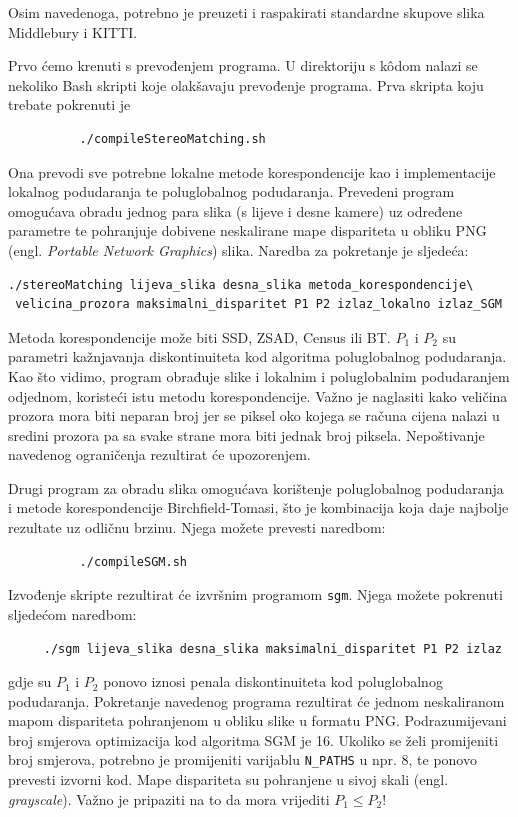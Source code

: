 \documentclass[utf8, zavrsni, numeric]{fer}
\begin{document}
Osim navedenoga, potrebno je preuzeti i raspakirati standardne skupove slika Middlebury i
KITTI.

Prvo ćemo krenuti s prevođenjem programa. U direktoriju s k\^odom nalazi se nekoliko Bash skripti koje olakšavaju prevođenje programa. Prva skripta koju trebate pokrenuti je
\begin{verbatim}
          ./compileStereoMatching.sh
\end{verbatim}
Ona prevodi sve potrebne lokalne metode korespondencije kao i implementacije lokalnog podudaranja te poluglobalnog podudaranja. Prevedeni program omogućava obradu jednog para slika (s lijeve i desne kamere) uz određene parametre te pohranjuje dobivene neskalirane mape dispariteta
u obliku PNG (engl. {\sl Portable Network Graphics}) slika. Naredba za pokretanje je sljedeća:
\begin{verbatim}
./stereoMatching lijeva_slika desna_slika metoda_korespondencije\
 velicina_prozora maksimalni_disparitet P1 P2 izlaz_lokalno izlaz_SGM
\end{verbatim}
Metoda korespondencije može biti SSD, ZSAD, Census ili BT. $P_1$ i $P_2$ su parametri kažnjavanja
diskontinuiteta kod algoritma poluglobalnog podudaranja. Kao što vidimo, program obrađuje slike
i lokalnim i poluglobalnim podudaranjem odjednom, koristeći istu metodu korespondencije.
Važno je naglasiti kako veličina prozora mora biti neparan broj jer se piksel oko kojega se računa cijena nalazi u sredini prozora pa sa svake strane mora biti jednak broj piksela.
Nepoštivanje navedenog ograničenja rezultirat će upozorenjem.

Drugi program za obradu slika omogućava korištenje poluglobalnog podudaranja i metode korespondencije Birchfield-Tomasi, što je kombinacija koja daje najbolje rezultate uz odličnu brzinu.
Njega možete prevesti naredbom:
\begin{verbatim}
          ./compileSGM.sh
\end{verbatim}

Izvođenje skripte rezultirat će izvršnim programom {\tt sgm}. Njega možete pokrenuti sljedećom naredbom:
\begin{verbatim}
     ./sgm lijeva_slika desna_slika maksimalni_disparitet P1 P2 izlaz
\end{verbatim}
gdje su $P_1$ i $P_2$ ponovo iznosi penala diskontinuiteta kod poluglobalnog podudaranja.
Pokretanje navedenog programa rezultirat će jednom neskaliranom mapom dispariteta pohranjenom
u obliku slike u formatu PNG.
Podrazumijevani broj smjerova optimizacija kod algoritma SGM je 16. Ukoliko se želi promijeniti
broj smjerova, potrebno je promijeniti varijablu {\verb|N_PATHS|} u npr. 8, te ponovo prevesti izvorni kod. Mape dispariteta su pohranjene u sivoj skali (engl. {\sl grayscale}).
Važno je pripaziti na to da mora vrijediti $P_1 \leq P_2$\/!
\end{document}
